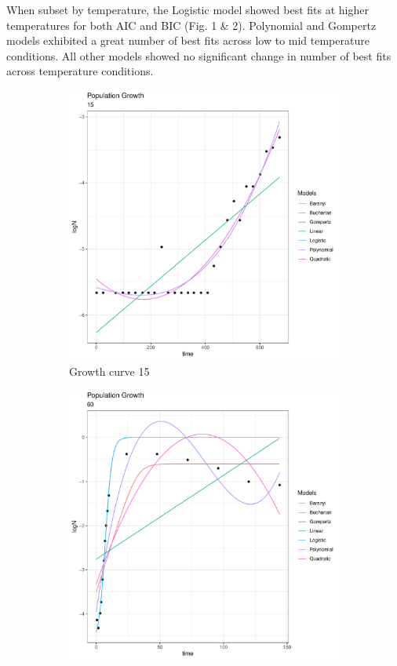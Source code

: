 \documentclass[titlepage]{article}
\begin{document}
When subset by temperature, the Logistic model showed best fits at higher temperatures for both AIC and BIC (Fig. 1 \& 2). Polynomial and Gompertz models exhibited a great number of best fits across low to mid temperature conditions. All other models showed no significant change in number of best fits across temperature conditions.

\begin{figure}
    \centering
    \begin{subfigure}[t]{0.45\textwidth}
        \centering
        \includegraphics[width=\linewidth]{../results/plot_fits/plot_15.pdf} 
        \caption{Growth curve 15} \label{fig:timing1}
    \end{subfigure}
    \hfill
    \begin{subfigure}[t]{0.45\textwidth}
        \centering
        \includegraphics[width=\linewidth]{../results/plot_fits/plot_60.pdf} 

\end{subfigure}
\end{figure}
\end{document}

